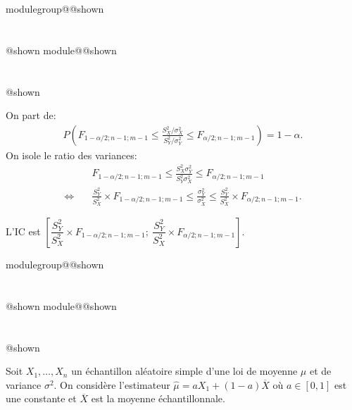 \documentclass{Evaluation}
\makeatletter
\newcommand{\currentmodulekey}{}
\newcommand{\currentmoduletitle}{}
\newcommand{\currentgroupkey}{}
\newcommand{\currentgrouptitle}{}
\newcommand{\showmoduleifneeded}{%
  \ifx\currentgroupkey\empty\else
    \expandafter\ifx\csname modulegroup@\currentgroupkey @shown\endcsname\relax
      \section*{\currentgrouptitle}%
      \expandafter\gdef\csname modulegroup@\currentgroupkey @shown\endcsname{1}%
    \fi
  \fi
  \expandafter\ifx\csname module@\currentmodulekey @shown\endcsname\relax
    \section*{\currentmoduletitle}%
    \expandafter\gdef\csname module@\currentmodulekey @shown\endcsname{1}%
  \fi
}
\newenvironment{A25}{\showmoduleifneeded}{}
\makeatother
\begin{document}
\begin{questions}
\begin{A25}
\begin{solution}
    On part de:
    \begin{align*}
        P\left(F_{1-\alpha/2;n-1;m-1} \leq \frac{S_X^2/\sigma^2_X}{S_Y^2/\sigma^2_Y} \leq F_{\alpha/2;n-1;m-1}\right) = 1-\alpha.
    \end{align*}
    On isole le ratio des variances:
    \begin{align*}
        & F_{1-\alpha/2;n-1;m-1} \leq \frac{S_X^2 \sigma^2_Y}{S_Y^2 \sigma^2_X} \leq F_{\alpha/2;n-1;m-1} \\
        \Leftrightarrow\quad & \frac{S_Y^2}{S_X^2} \times F_{1-\alpha/2;n-1;m-1} \leq \frac{\sigma^2_Y}{\sigma^2_X} \leq \frac{S_Y^2}{S_X^2} \times F_{\alpha/2;n-1;m-1}.
    \end{align*}

    L'IC est $\left[\dfrac{S_Y^2}{S_X^2}\times F_{1-\alpha/2;n-1;m-1};~ \dfrac{S_Y^2}{S_X^2}\times F_{\alpha/2;n-1;m-1}\right]$.
\end{solution}
\end{A25}

\begin{A25}
\question Soit $X_1,\ldots,X_n$ un échantillon aléatoire simple d'une loi de moyenne $\mu$ et de variance $\sigma^2$. On considère l'estimateur $\hat{\mu}=aX_1 + (1-a)\overline{X}$ où $a\in[0,1]$ est une constante et $\overline{X}$ est la moyenne échantillonnale.

\end{A25}
\end{questions}
\end{document}
